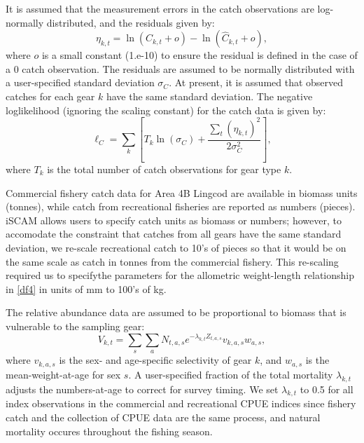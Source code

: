 \documentclass[11pt]{article}   %
\def\headc{\vspace{-1ex}} %
\def\subsub#1{\noindent {\bf #1} \headc}    %
\begin{document}
\subsub{Catch Data}

It is assumed that the measurement errors in the catch observations are log-normally distributed, and the residuals given by:
\begin{equation}\label{df27}
\eta_{k,t}=\ln(C_{k,t}+o) -  \ln(\hat{C}_{k,t}+o),
\end{equation}
where $o$ is  a small constant (1.e-10) to ensure the residual is defined in the case of a 0 catch observation.  The residuals are assumed to be normally distributed with a user-specified standard deviation $\sigma_{C}$.  At present, it is assumed that observed catches for each gear $k$  have the same standard deviation.  The negative loglikelihood (ignoring the scaling constant) for the catch data is given by:
\begin{equation}\label{df28}
\ell_C = \sum_k\left[  T_k\ln(\sigma_C)+\frac{\sum_t(\eta_{k,t})^2}{2\sigma_C^2}\right],
\end{equation}
where $T_k$ is the total number of catch observations for gear type $k$.

Commercial fishery catch data for Area 4B Lingcod are available in biomass units (tonnes), while catch from recreational fisheries are reported as numbers (pieces).  iSCAM allows users to specify catch units as biomass or numbers; however, to accomodate the constraint that catches from all gears have the same standard deviation, we re-scale recreational catch to 10's of pieces so that it would be on the same scale as catch in tonnes from the commercial fishery.  This re-scaling required us to specifythe parameters for the allometric weight-length relationship in \eqref{df4} in units of mm to 100's of kg.

\subsub{Relative Abundance Data}

The relative abundance data are assumed to be proportional to biomass that is vulnerable to the sampling gear:
\begin{equation}\label{df29}
 V_{k,t} = \sum_s \sum_a N_{t,a,s} e^{-\lambda_{k,t} Z_{t,a,s}} v_{k,a,s} w_{a,s},
\end{equation}
where $v_{k,a,s}$ is the sex- and age-specific selectivity of gear $k$, and $w_{a,s}$ is the mean-weight-at-age for sex $s$.  A user-specified fraction of the total mortality $\lambda_{k,t}$ adjusts the numbers-at-age to correct for survey timing.  We set $\lambda_{k,t}$ to 0.5 for all index observations in the commercial and recreational CPUE indices since fishery catch and the collection of CPUE data are the same process, and natural mortality occures throughout the fishing season. 
\end{document}
